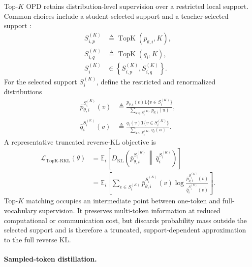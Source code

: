 \documentclass{llmxive}
\begin{document}
Top-\(K\) OPD retains distribution-level supervision over a restricted local
support. Common choices include a student-selected support
\citep{li2026rethinkingopd,ye2026opcd} and a teacher-selected support
\citep{fu2026revisitingopd}:
\begin{equation*}
\begin{aligned}
 S_{i,p}^{(K)}
 &\triangleq
 \operatorname{TopK}(p_{\theta,i},K),\\
 S_{i,q}^{(K)}
 &\triangleq
 \operatorname{TopK}(q_i,K),\\
 S_i^{(K)}
 &\in
 \left\{S_{i,p}^{(K)},S_{i,q}^{(K)}\right\}.
\end{aligned}
\end{equation*}
For the selected support \(S_i^{(K)}\), define the restricted and
renormalized distributions
\begin{equation*}
\begin{aligned}
 \bar p_{\theta,i}^{S_i^{(K)}}(v)
 &\triangleq
 \frac{
 p_{\theta,i}(v)\mathbf 1\{v\in S_i^{(K)}\}
 }{
 \sum_{u\in S_i^{(K)}}p_{\theta,i}(u)
 },\\
 \bar q_i^{S_i^{(K)}}(v)
 &\triangleq
 \frac{
 q_i(v)\mathbf 1\{v\in S_i^{(K)}\}
 }{
 \sum_{u\in S_i^{(K)}}q_i(u)
 }.
\end{aligned}
\end{equation*}
A representative truncated reverse-KL objective is
\begin{equation*}
\begin{aligned}
 \mathcal L_{\mathrm{TopK\text{-}RKL}}(\theta)
 &=
 \mathbb E_i\!\left[
 D_{\mathrm{KL}}\!\left(
 \bar p_{\theta,i}^{S_i^{(K)}}
 \,\middle\|\,
 \bar q_i^{S_i^{(K)}}
 \right)
 \right]\\
 &=
 \mathbb E_i\!\left[
 \sum_{v\in S_i^{(K)}}
 \bar p_{\theta,i}^{S_i^{(K)}}(v)
 \log
 \frac{
 \bar p_{\theta,i}^{S_i^{(K)}}(v)
 }{
 \bar q_i^{S_i^{(K)}}(v)
 }
 \right].
\end{aligned}
\end{equation*}
Top-\(K\) matching occupies an intermediate point between one-token and
full-vocabulary supervision. It preserves multi-token information at reduced
computational or communication cost, but discards probability mass outside the
selected support and is therefore a truncated, support-dependent approximation
to the full reverse KL.

\paragraph{Sampled-token distillation.}
\end{document}
